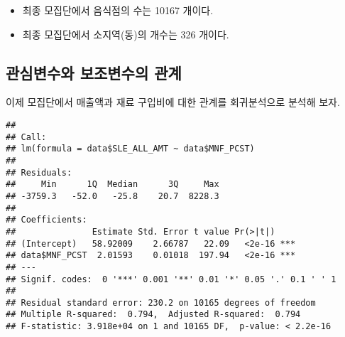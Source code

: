 \documentclass[
]{book}
\newenvironment{Shaded}{\begin{snugshade}}{\end{snugshade}}
\newcommand{\AttributeTok}[1]{\textcolor[rgb]{0.77,0.63,0.00}{#1}}
\newcommand{\FunctionTok}[1]{\textcolor[rgb]{0.00,0.00,0.00}{#1}}
\newcommand{\NormalTok}[1]{#1}
\newcommand{\OtherTok}[1]{\textcolor[rgb]{0.56,0.35,0.01}{#1}}
\newcommand{\SpecialCharTok}[1]{\textcolor[rgb]{0.00,0.00,0.00}{#1}}
\newcommand{\StringTok}[1]{\textcolor[rgb]{0.31,0.60,0.02}{#1}}
\begin{document}
\begin{itemize}
\item
  최종 모집단에서 음식점의 수는 10167 개이다.
\item
  최종 모집단에서 소지역(동)의 개수는 326 개이다.
\end{itemize}

\hypertarget{uxad00uxc2ecuxbcc0uxc218uxc640-uxbcf4uxc870uxbcc0uxc218uxc758-uxad00uxacc4}{%
\subsection{관심변수와 보조변수의 관계}\label{uxad00uxc2ecuxbcc0uxc218uxc640-uxbcf4uxc870uxbcc0uxc218uxc758-uxad00uxacc4}}

이제 모집단에서 매출액과 재료 구입비에 대한 관계를 회귀분석으로 분석해 보자.

\begin{Shaded}
\end{Shaded}

\begin{verbatim}
## 
## Call:
## lm(formula = data$SLE_ALL_AMT ~ data$MNF_PCST)
## 
## Residuals:
##     Min      1Q  Median      3Q     Max 
## -3759.3   -52.0   -25.8    20.7  8228.3 
## 
## Coefficients:
##               Estimate Std. Error t value Pr(>|t|)    
## (Intercept)   58.92009    2.66787   22.09   <2e-16 ***
## data$MNF_PCST  2.01593    0.01018  197.94   <2e-16 ***
## ---
## Signif. codes:  0 '***' 0.001 '**' 0.01 '*' 0.05 '.' 0.1 ' ' 1
## 
## Residual standard error: 230.2 on 10165 degrees of freedom
## Multiple R-squared:  0.794,  Adjusted R-squared:  0.794 
## F-statistic: 3.918e+04 on 1 and 10165 DF,  p-value: < 2.2e-16
\end{verbatim}

\begin{Shaded}
\end{Shaded}
\end{document}
